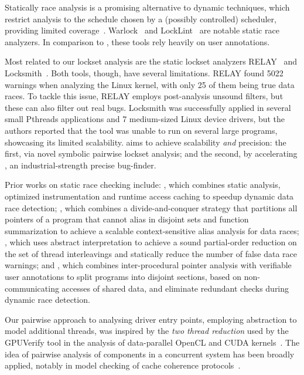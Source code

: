 Statically race analysis is a promising alternative to dynamic techniques, which restrict analysis to the schedule chosen by a (possibly controlled) scheduler, providing limited coverage~\cite{musuvathi2008finding}. Warlock~\cite{sterling1993warlock} and LockLint~\cite{oracle2010locklint} are notable static race analyzers.  In comparison to \whoop, these tools rely heavily on user annotations.

Most related to our lockset analysis are the static lockset analyzers RELAY~\cite{voung2007relay} and Locksmith~\cite{pratikakis2006locksmith}. Both tools, though, have several limitations. RELAY found 5022 warnings when analyzing the Linux kernel, with only 25 of them being true data races. To tackle this issue, RELAY employs post-analysis unsound filters, but these can also filter out real bugs. Locksmith was successfully applied in several small Pthreads applications and 7 medium-sized Linux device drivers, but the authors reported that the tool was unable to run on several large programs, showcasing its limited scalability. \whoop aims to achieve scalability \emph{and} precision: the first, via novel symbolic pairwise lockset analysis; and the second, by accelerating \corral, an industrial-strength precise bug-finder.

Prior works on static race checking include: \cite{choi2002efficient}, which combines static analysis, optimized instrumentation and runtime access caching to speedup dynamic data race detection; \cite{kahlon2007fast}, which combines a divide-and-conquer strategy that partitions all pointers of a program that cannot alias in disjoint sets and function summarization to achieve a scalable context-sensitive alias analysis for data races; \cite{kahlon2009semantic}, which uses abstract interpretation to achieve a sound partial-order reduction on the set of thread interleavings and statically reduce the number of false data race warnings; and \cite{das2015section}, which combines inter-procedural pointer analysis with verifiable user annotations to split programs into disjoint sections, based on non-communicating accesses of shared data, and eliminate redundant checks during dynamic race detection.

Our pairwise approach to analysing driver entry points, employing abstraction to model additional threads, was inspired by the \emph{two thread reduction} used by the GPUVerify tool in the analysis of data-parallel OpenCL and CUDA kernels~\cite{gpuverify,bardsley2014engineering}.  The idea of pairwise analysis of components in a concurrent system has been broadly applied, notably in model checking of cache coherence protocols~\cite{mcmillan1999verification}.
